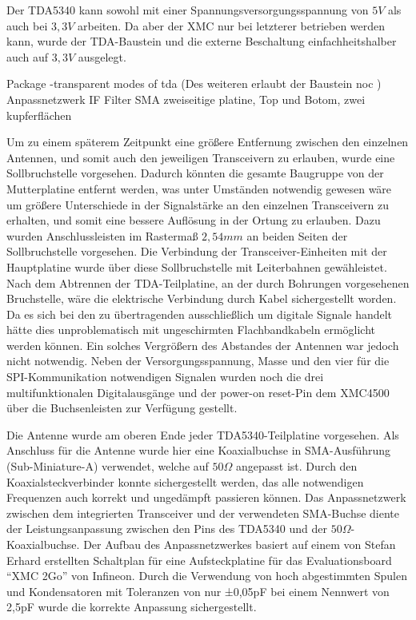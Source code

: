 Der TDA5340 kann sowohl mit einer Spannungsversorgungsspannung von $5V$ als auch bei $3,3V$ arbeiten. Da aber der XMC nur bei letzterer betrieben werden kann, wurde der TDA-Baustein und die externe Beschaltung einfachheitshalber auch auf  $3,3V$ ausgelegt. 

Package -transparent modes of tda (Des weiteren erlaubt der Baustein noc )
Anpassnetzwerk
IF Filter 
SMA
zweiseitige platine, Top und Botom, zwei kupferflächen


Um zu einem späterem Zeitpunkt eine größere Entfernung zwischen den einzelnen Antennen, und somit auch den jeweiligen Transceivern zu erlauben, wurde eine Sollbruchstelle vorgesehen. Dadurch könnten die gesamte Baugruppe von der Mutterplatine entfernt werden, was unter Umständen notwendig gewesen wäre um größere Unterschiede in der Signalstärke an den einzelnen Transceivern zu erhalten, und somit eine bessere Auflösung in der Ortung zu erlauben. Dazu wurden Anschlussleisten im Rastermaß $2,54mm$ an beiden Seiten der Sollbruchstelle vorgesehen. Die Verbindung der Transceiver-Einheiten mit der Hauptplatine wurde über diese Sollbruchstelle mit Leiterbahnen gewähleistet. Nach dem Abtrennen der TDA-Teilplatine, an der durch Bohrungen vorgesehenen Bruchstelle, wäre die elektrische Verbindung durch Kabel sichergestellt worden. Da es sich bei den zu übertragenden ausschließlich um digitale Signale handelt hätte dies unproblematisch mit ungeschirmten Flachbandkabeln ermöglicht werden können. Ein solches Vergrößern des Abstandes der Antennen war jedoch nicht notwendig. Neben der Versorgungsspannung, Masse und den vier für die SPI-Kommunikation notwendigen Signalen wurden noch die drei multifunktionalen Digitalausgänge und der power-on reset-Pin dem XMC4500 über die Buchsenleisten zur Verfügung gestellt.


 
Die Antenne wurde am oberen Ende jeder TDA5340-Teilplatine vorgesehen. Als Anschluss für die Antenne wurde hier eine Koaxialbuchse in SMA-Ausführung (Sub-Miniature-A) verwendet, welche auf $50\Omega$ angepasst ist. Durch den Koaxialsteckverbinder konnte sichergestellt werden, das alle notwendigen Frequenzen auch korrekt und ungedämpft passieren können. 
Das Anpassnetzwerk zwischen dem  integrierten Transceiver und der verwendeten SMA-Buchse diente der Leistungsanpassung zwischen den Pins des TDA5340 und der $50\Omega$-Koaxialbuchse. Der Aufbau des Anpassnetzwerkes basiert auf einem von Stefan Erhard erstellten Schaltplan für eine Aufsteckplatine für das Evaluationsboard \enquote{XMC 2Go} von Infineon. Durch die Verwendung von hoch abgestimmten Spulen und Kondensatoren mit Toleranzen von nur ±0,05pF bei einem Nennwert von 2,5pF wurde die korrekte Anpassung sichergestellt. 
 
